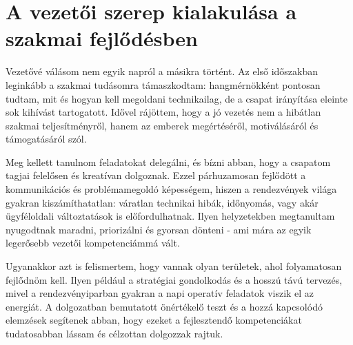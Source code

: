 \section{A vezetői szerep kialakulása a szakmai fejlődésben}

Vezetővé válásom nem egyik napról a másikra történt. Az első időszakban leginkább a szakmai tudásomra 
támaszkodtam: hangmérnökként pontosan tudtam, mit és hogyan kell megoldani technikailag, 
de a csapat irányítása eleinte sok kihívást tartogatott. Idővel rájöttem, hogy a jó vezetés nem a hibátlan 
szakmai teljesítményről, hanem az emberek megértéséről, motiválásáról és támogatásáról szól.

Meg kellett tanulnom feladatokat delegálni, és bízni abban, hogy a csapatom tagjai felelősen és kreatívan dolgoznak. 
Ezzel párhuzamosan fejlődött a kommunikációs és problémamegoldó képességem, hiszen a rendezvények világa gyakran 
kiszámíthatatlan: váratlan technikai hibák, időnyomás, vagy akár ügyféloldali változtatások is előfordulhatnak. 
Ilyen helyzetekben megtanultam nyugodtnak maradni, priorizálni és gyorsan dönteni - ami mára az egyik legerősebb 
vezetői kompetenciámmá vált.

Ugyanakkor azt is felismertem, hogy vannak olyan területek, ahol folyamatosan fejlődnöm kell. 
Ilyen például a stratégiai gondolkodás és a hosszú távú tervezés, mivel a rendezvényiparban gyakran a napi operatív 
feladatok viszik el az energiát. A dolgozatban bemutatott önértékelő teszt és a hozzá kapcsolódó elemzések 
segítenek abban, hogy ezeket a fejlesztendő kompetenciákat tudatosabban lássam és célzottan dolgozzak rajtuk.
